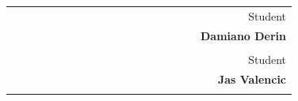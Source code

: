 \begin{titlepage}
\begin{center}
            \vfill
            \begin{table}[h]
            {\large
            \begin{tabular}{c c c c c c c c c c c c c c c c | c r}
                & & & & & & & & & & & & & & & & & Student                 \\
                & & & & & & & & & & & & & & & & & \bfseries Damiano Derin \\
                & & & & & & & & & & & & & & & & &                         \\
                & & & & & & & & & & & & & & & & & Student                 \\
                & & & & & & & & & & & & & & & & & \bfseries Jas Valencic  \\
                & & & & & & & & & & & & & & & & &                         \\
                \hline
            \end{tabular}
            }
            \end{table}
            \vspace{1cm}
        \end{center}
    \end{titlepage}
